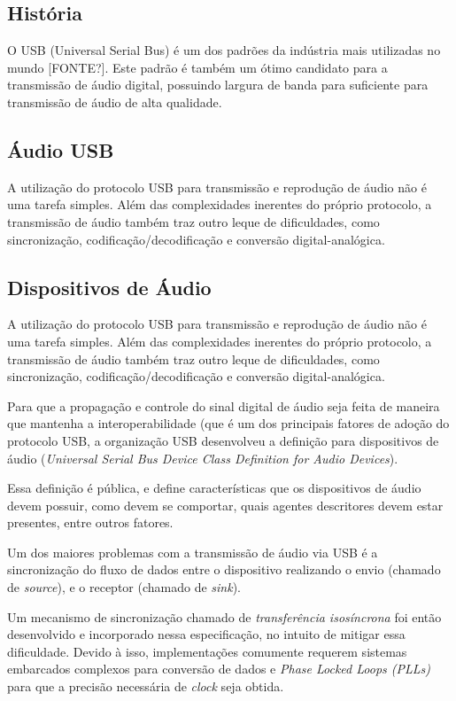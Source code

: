 \subsection{História}
O USB (Universal Serial Bus) é um dos padrões da indústria mais utilizadas no mundo [FONTE?]. Este padrão é também um ótimo candidato para a transmissão de áudio digital, possuindo largura de banda para suficiente para transmissão de áudio de alta qualidade.
\subsection{Áudio USB}
A utilização do protocolo USB para transmissão e reprodução de áudio não é uma tarefa simples. Além das complexidades inerentes do próprio protocolo, a transmissão de áudio também traz outro leque de dificuldades, como sincronização, codificação/decodificação e conversão digital-analógica. 
\subsection{Dispositivos de Áudio}
A utilização do protocolo USB para transmissão e reprodução de áudio não é uma tarefa simples. Além das complexidades inerentes do próprio protocolo, a transmissão de áudio também traz outro leque de dificuldades, como sincronização, codificação/decodificação e conversão digital-analógica. 

Para que a propagação e controle do sinal digital de áudio seja feita de maneira que mantenha a interoperabilidade (que é um dos principais fatores de adoção do protocolo USB, a organização USB desenvolveu a definição para dispositivos de áudio (\textit{Universal Serial Bus Device Class Definition for Audio Devices}).

Essa definição é pública, e define características que os dispositivos de áudio devem possuir, como devem se comportar, quais agentes descritores devem estar presentes, entre outros fatores. 

Um dos maiores problemas com a transmissão de áudio via USB é a sincronização do fluxo de dados entre o dispositivo realizando o envio (chamado de \textit{source}), e o receptor (chamado de \textit{sink}). 

Um mecanismo de sincronização chamado de \textit{transferência isosíncrona} foi então desenvolvido e incorporado nessa especificação, no intuito de mitigar essa dificuldade. Devido à isso, implementações comumente requerem sistemas embarcados complexos para conversão de dados e \textit{Phase Locked Loops (PLLs)} para que a precisão necessária de \textit{clock} seja obtida. 

